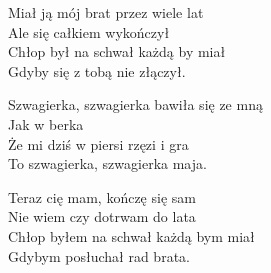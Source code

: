 \begin{text}
    Miał ją mój brat przez wiele lat\\
    Ale się całkiem wykończył\\
    Chłop był na schwał każdą by miał\\
    Gdyby się z tobą nie złączył.

    Szwagierka, szwagierka bawiła się ze mną\\
    Jak w berka\\
    Że mi dziś w piersi rzęzi i gra\\
    To szwagierka, szwagierka maja.

    Teraz cię mam, kończę się sam\\
    Nie wiem czy dotrwam do lata\\
    Chłop byłem na schwał każdą bym miał\\
    Gdybym posłuchał rad brata.
\end{text}
\begin{chord}

\end{chord}